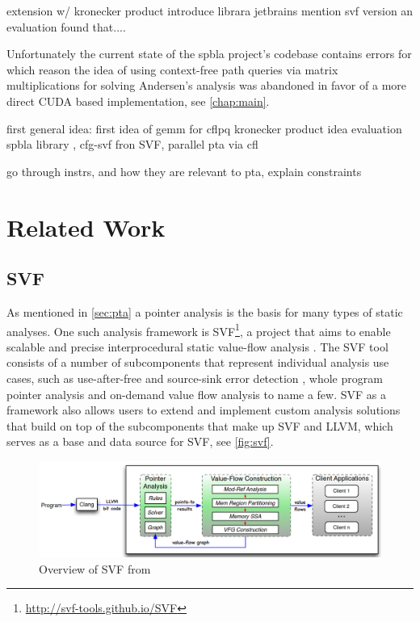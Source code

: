 extension w/ kronecker product \cite{orachev2020context}
introduce librara jetbrains \cite{orachev2021spbla}
mention svf version \cite{lei2022taming}
an evaluation found that.... \cite{mishin2019evaluation}

Unfortunately the current state of the spbla project's codebase contains errors for which reason the idea of using context-free path queries via matrix multiplications for solving Andersen's analysis was abandoned in favor of a more direct CUDA based implementation, see \autoref{chap:main}.

first general idea: \cite{reps1998program} first idea of gemm for cflpq \cite{azimov2018context} kronecker product idea \cite{orachev2020context} evaluation \cite{mishin2019evaluation} spbla library \cite{orachev2021spbla}, cfg-svf \cite{lei2022taming} fron SVF, parallel pta via cfl \cite{su2014parallel}

go through instrs, and how they are relevant to pta, explain constraints \cite{lin2015alias}
\section{Related Work}
\subsection{SVF}\label{sec:svf}
As mentioned in \autoref{sec:pta} a pointer analysis is the basis for many types of static analyses.
One such analysis framework is SVF\footnote{\url{http://svf-tools.github.io/SVF}}, a project that aims to enable scalable and precise interprocedural static value-flow analysis \cite{sui2016svf}. The SVF tool consists of a number of subcomponents that represent individual analysis use cases, such as use-after-free and source-sink error detection \cite{sui2014detecting}, whole program pointer analysis and on-demand value flow analysis \cite{sui2018value} to name a few.
SVF as a framework also allows users to extend and implement custom analysis solutions that build on top of the subcomponents that make up SVF and LLVM, which serves as a base and data source for SVF, see \autoref{fig:svf}.

\begin{figure}
    \centering
    \includegraphics[width=1.\textwidth]{img/svf.png}
    \caption{Overview of SVF from \cite{sui2016svf}}
    \label{fig:svf}
\end{figure}

